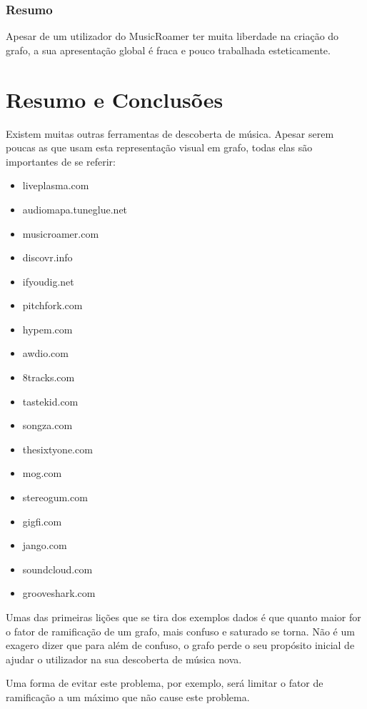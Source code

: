 
  \subsubsection{Resumo} %
  \label{ssub:resumo}

  Apesar de um utilizador do MusicRoamer ter muita liberdade na criação do grafo, a sua apresentação global é fraca e pouco trabalhada esteticamente.
  





\section{Resumo e Conclusões}

Existem muitas outras ferramentas de descoberta de música. Apesar serem poucas as que usam esta representação visual em grafo, todas elas são importantes de se referir:

\begin{itemize}
  \item liveplasma.com
  \item audiomapa.tuneglue.net
  \item musicroamer.com
  \item discovr.info
  \item ifyoudig.net
  \item pitchfork.com
  \item hypem.com
  \item awdio.com
  \item 8tracks.com
  \item tastekid.com
  \item songza.com
  \item thesixtyone.com
  \item mog.com
  \item stereogum.com
  \item gigfi.com
  \item jango.com
  \item soundcloud.com
  \item grooveshark.com
\end{itemize}


Umas das primeiras lições que se tira dos exemplos dados é que quanto maior for o fator de ramificação de um grafo, mais confuso e saturado se torna.
Não é um exagero dizer que para além de confuso, o grafo perde o seu propósito inicial de ajudar o utilizador na sua descoberta de música nova.

Uma forma de evitar este problema, por exemplo, será limitar o fator de ramificação a um máximo que não cause este problema.